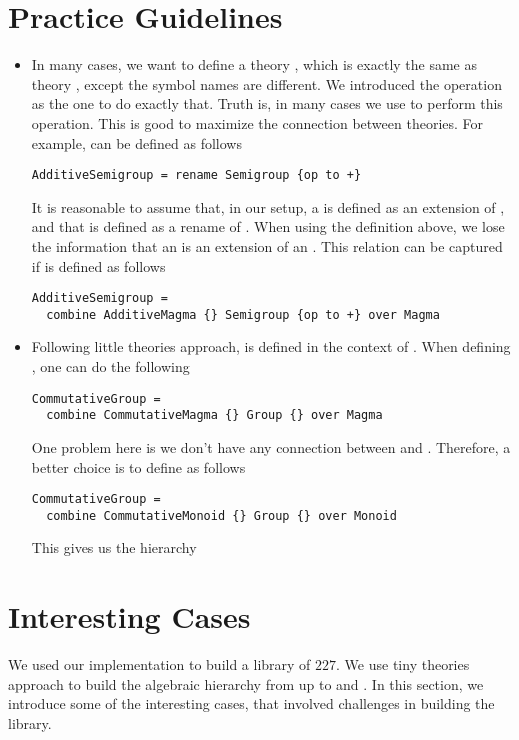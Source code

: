 \section{Practice Guidelines}
\begin{itemize}
    \item In many cases, we want to define a theory , which is exactly the same as theory , except the symbol names are different. We introduced the  operation as the one to do exactly that. Truth is, in many cases we use  to perform this operation. This is good to maximize the connection between theories. For example,   can be defined as follows
\begin{lstlisting}
AdditiveSemigroup = rename Semigroup {op to +}
\end{lstlisting}
     It is reasonable to assume that, in our setup, a  is defined as an extension of , and that  is defined as a rename of . When using the definition above, we lose the information that an  is an extension of an . This relation can be captured if  is defined as follows 
\begin{lstlisting}
AdditiveSemigroup = 
  combine AdditiveMagma {} Semigroup {op to +} over Magma 
\end{lstlisting}

    \item Following little theories approach,  is defined in the context of . When defining , one can do the following 
\begin{lstlisting}
CommutativeGroup = 
  combine CommutativeMagma {} Group {} over Magma
\end{lstlisting}
    One problem here is we don't have any connection between  and . Therefore, a better choice is to define  as follows 
\begin{lstlisting}
CommutativeGroup = 
  combine CommutativeMonoid {} Group {} over Monoid
\end{lstlisting}
This gives us the hierarchy 
\end{itemize}


\section{Interesting Cases}
\label{sec:interesting_cases}
We used our implementation to build a library of $227$. We use tiny theories approach to build the algebraic hierarchy from  up to  and  . In this section, we introduce some of the interesting cases, that involved challenges in building the library. 

